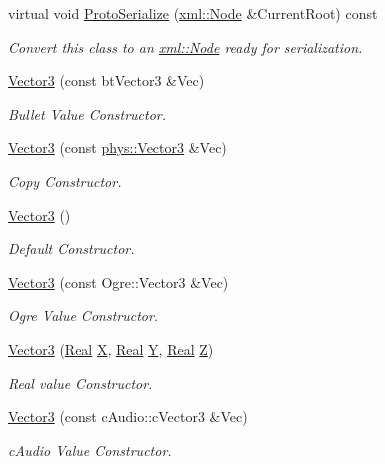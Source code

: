 \begin{DoxyCompactItemize}
virtual void \hyperlink{classphys_1_1Vector3_a6713cfb8c5cd8918701ec8bee58b7322}{ProtoSerialize} (\hyperlink{classphys_1_1xml_1_1Node}{xml::Node} \&CurrentRoot) const 
\begin{DoxyCompactList}\small\item\em Convert this class to an \hyperlink{classphys_1_1xml_1_1Node}{xml::Node} ready for serialization. \item\end{DoxyCompactList}\item 
\hyperlink{classphys_1_1Vector3_ac13a263c5e2f84578884183cee890570}{Vector3} (const btVector3 \&Vec)
\begin{DoxyCompactList}\small\item\em Bullet Value Constructor. \item\end{DoxyCompactList}\item 
\hyperlink{classphys_1_1Vector3_ac22e136942a20df0129ef166f6fafb87}{Vector3} (const \hyperlink{classphys_1_1Vector3}{phys::Vector3} \&Vec)
\begin{DoxyCompactList}\small\item\em Copy Constructor. \item\end{DoxyCompactList}\item 
\hyperlink{classphys_1_1Vector3_af328c400a03fdb8d2a99fd58382d61cb}{Vector3} ()
\begin{DoxyCompactList}\small\item\em Default Constructor. \item\end{DoxyCompactList}\item 
\hyperlink{classphys_1_1Vector3_ac08281de8f4929593b6f4469646691da}{Vector3} (const Ogre::Vector3 \&Vec)
\begin{DoxyCompactList}\small\item\em Ogre Value Constructor. \item\end{DoxyCompactList}\item 
\hyperlink{classphys_1_1Vector3_af1d323b44d7b6ee3d0a79a196d9967da}{Vector3} (\hyperlink{namespacephys_af7eb897198d265b8e868f45240230d5f}{Real} \hyperlink{classphys_1_1Vector3_a23660f9d1e21a25c53aa06aa737bb56b}{X}, \hyperlink{namespacephys_af7eb897198d265b8e868f45240230d5f}{Real} \hyperlink{classphys_1_1Vector3_a6c9bc2ab0995d5056dba8272c650e58e}{Y}, \hyperlink{namespacephys_af7eb897198d265b8e868f45240230d5f}{Real} \hyperlink{classphys_1_1Vector3_a53c84fa4b38fb9c4a4d822b04c200b13}{Z})
\begin{DoxyCompactList}\small\item\em Real value Constructor. \item\end{DoxyCompactList}\item 
\hyperlink{classphys_1_1Vector3_a9f0f452baf92e0c10e6eb0944dc2b3d3}{Vector3} (const cAudio::cVector3 \&Vec)
\begin{DoxyCompactList}\small\item\em cAudio Value Constructor. \item\end{DoxyCompactList}\end{DoxyCompactItemize}
